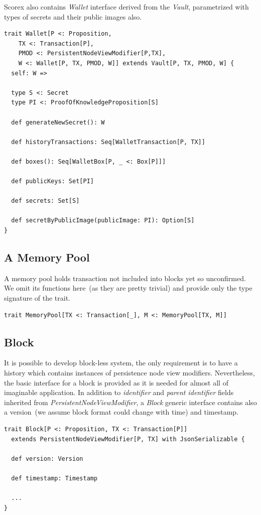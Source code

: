 \documentclass[]{report}   %
\begin{document}
Scorex also contains \textit{Wallet} interface derived from the \textit{Vault}, parametrized with types of secrets and their public images also.

\begin{lstlisting}
trait Wallet[P <: Proposition, 
	TX <: Transaction[P], 
	PMOD <: PersistentNodeViewModifier[P,TX], 
	W <: Wallet[P, TX, PMOD, W]] extends Vault[P, TX, PMOD, W] {
  self: W =>

  type S <: Secret
  type PI <: ProofOfKnowledgeProposition[S]

  def generateNewSecret(): W

  def historyTransactions: Seq[WalletTransaction[P, TX]]

  def boxes(): Seq[WalletBox[P, _ <: Box[P]]]

  def publicKeys: Set[PI]

  def secrets: Set[S]

  def secretByPublicImage(publicImage: PI): Option[S]
}
\end{lstlisting}


\subsection{A Memory Pool}

A memory pool holds transaction not included into blocks yet so unconfirmed. We omit its functions here~(as they are pretty trivial) and provide only the type signature of the trait.  

\begin{lstlisting}
trait MemoryPool[TX <: Transaction[_], M <: MemoryPool[TX, M]]
\end{lstlisting}


\subsection{Block}

It is possible to develop block-less system, the only requirement is to have a history which contains instances of persistence node view modifiers. Nevertheless, the basic interface for a block is provided as it is needed for almost all of imaginable application. In addition to \textit{identifier} and \textit{parent identifier} fields inherited from \textit{PersistentNodeViewModifier}, a \textit{Block} generic interface contains also a version~(we assume block format could change with time) and timestamp.

\begin{lstlisting}
trait Block[P <: Proposition, TX <: Transaction[P]]
  extends PersistentNodeViewModifier[P, TX] with JsonSerializable {

  def version: Version

  def timestamp: Timestamp

  ...
}
\end{lstlisting}
\end{document}
